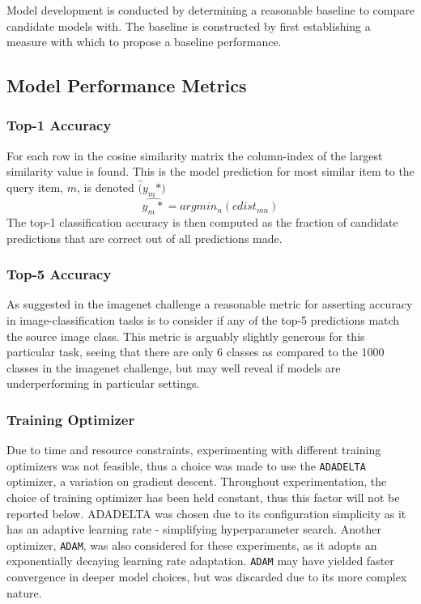 Model development is conducted by determining a reasonable baseline to compare candidate models with. 
The baseline is constructed by first establishing a measure with which to propose a baseline performance. 

\subsection{Model Performance Metrics}\label{sec:MPM}
\subsubsection{Top-1 Accuracy}
For each row in the cosine similarity matrix the column-index of the largest similarity value is found. 
This is the model prediction for most similar item to the query item, $m$, is denoted $\widehat(y_{m}*)$
$$
\widehat{y_{m}*} = argmin_{n}(cdist_{mn})
$$
The top-1 classification accuracy is then computed as the fraction of candidate predictions that are correct out of all predictions made.

\subsubsection{Top-5 Accuracy}
As suggested in the imagenet challenge\autocite{ILSVRC15} a reasonable metric for asserting accuracy in image-classification tasks is to consider if any of the top-5 predictions match the source image class.
This metric is arguably slightly generous for this particular task, seeing that there are only 6 classes as compared to the 1000 classes in the imagenet challenge, but may well reveal if models are underperforming in particular settings.

\subsubsection{Training Optimizer}
Due to time and resource constraints, experimenting with different training optimizers was not feasible, thus a choice was made to use the \texttt{ADADELTA}\autocite{Zeiler2012} optimizer, a variation on gradient descent.
Throughout experimentation, the choice of training optimizer has been held constant, thus this factor will not be reported below.
ADADELTA was chosen due to its configuration simplicity as it has an adaptive learning rate - simplifying hyperparameter search.
Another optimizer, \texttt{ADAM}, was also considered for these experiments, as it adopts an exponentially decaying learning rate adaptation. 
\texttt{ADAM} may have yielded faster convergence in deeper model choices\autocite{Kingma2015}, but was discarded due to its more complex nature.


